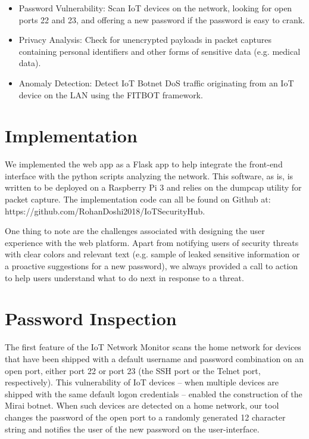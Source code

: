 \begin{itemize}
	\item Password Vulnerability: Scan IoT devices on the network, looking for open ports 22 and 23, and offering a new password if the password is easy to crank. 
	\item Privacy Analysis: Check for unencrypted payloads in packet captures containing personal identifiers and other forms of sensitive data (e.g. medical data).
	\item Anomaly Detection: Detect IoT Botnet DoS traffic originating from an IoT device on the LAN using the FITBOT framework.
\end{itemize}

\section{Implementation}
We implemented the web app as a Flask app to help integrate the front-end interface with the python scripts analyzing the network. This software, as is, is written to be deployed on a Raspberry Pi 3 and relies on the dumpcap utility for packet capture. The implementation code can all be found on Github at: https://github.com/RohanDoshi2018/IoTSecurityHub.	
		
One thing to note are the challenges associated with designing the user experience with the web platform. Apart from notifying users of security threats with clear colors and relevant text (e.g. sample of leaked sensitive information or a proactive suggestions for a new password), we always provided a call to action to help users understand what to do next in response to a threat.

\section{Password Inspection}
The first feature of the IoT Network Monitor scans the home network for devices that have been shipped with a default username and password combination on an open port, either port 22 or port 23 (the SSH port or the Telnet port, respectively). This vulnerability of IoT devices – when multiple devices are shipped with the same default logon credentials – enabled the construction of the Mirai botnet. When such devices are detected on a home network, our tool changes the password of the open port to a randomly generated 12 character string and notifies the user of the new password on the user-interface.

